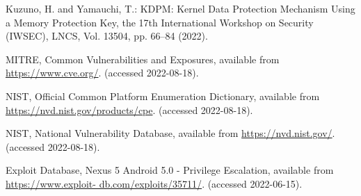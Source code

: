 \documentclass[paper]{ieice}
\begin{document}
\begin{thebibliography}{99}

  Kuzuno, H. and Yamauchi, T.: KDPM: Kernel Data Protection Mechanism Using a Memory Protection Key,
  the 17th International Workshop on Security (IWSEC), LNCS, Vol. 13504, pp. 66--84 (2022).


    MITRE, Common Vulnerabilities and Exposures,
    available from
    \url{https://www.cve.org/}.  (accessed 2022-08-18).
    
    NIST, Official Common Platform Enumeration Dictionary,
    available from
    \url{https://nvd.nist.gov/products/cpe}.  (accessed 2022-08-18).


    NIST, National Vulnerability Database,
    available from
    \url{https://nvd.nist.gov/}.  (accessed 2022-08-18).

    
    
  Exploit Database, Nexus 5 Android 5.0 - Privilege Escalation, available from \url{https://www.exploit- db.com/exploits/35711/}. (accessed 2022-06-15).



\end{thebibliography}
\end{document}
